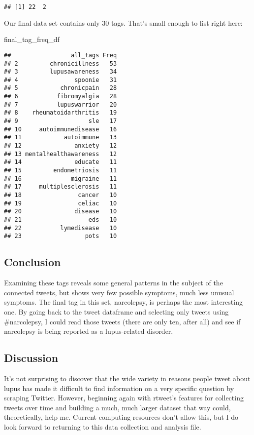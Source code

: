 \documentclass[]{article}
\newenvironment{Shaded}{\begin{snugshade}}{\end{snugshade}}
\newcommand{\NormalTok}[1]{#1}
\begin{document}
\begin{verbatim}
## [1] 22  2
\end{verbatim}

Our final data set contains only 30 tags. That's small enough to list
right here:

\begin{Shaded}
\begin{Highlighting}[]
\NormalTok{final_tag_freq_df}
\end{Highlighting}
\end{Shaded}

\begin{verbatim}
##                 all_tags Freq
## 2         chronicillness   53
## 3         lupusawareness   34
## 4                spoonie   31
## 5            chronicpain   28
## 6           fibromyalgia   28
## 7           lupuswarrior   20
## 8    rheumatoidarthritis   19
## 9                    sle   17
## 10     autoimmunedisease   16
## 11            autoimmune   13
## 12               anxiety   12
## 13 mentalhealthawareness   12
## 14               educate   11
## 15         endometriosis   11
## 16              migraine   11
## 17     multiplesclerosis   11
## 18                cancer   10
## 19                celiac   10
## 20               disease   10
## 21                   eds   10
## 22           lymedisease   10
## 23                  pots   10
\end{verbatim}

\hypertarget{conclusion}{%
\subsection{Conclusion}\label{conclusion}}

Examining these tags reveals some general patterns in the subject of the
connected tweets, but shows very few possible symptoms, much less
unusual symptoms. The final tag in this set, narcolepsy, is perhaps the
most interesting one. By going back to the tweet dataframe and selecting
only tweets using \#narcolepsy, I could read those tweets (there are
only ten, after all) and see if narcolepsy is being reported as a
lupus-related disorder.

\hypertarget{discussion}{%
\subsection{Discussion}\label{discussion}}

It's not surprising to discover that the wide variety in reasons people
tweet about lupus has made it difficult to find information on a very
specific question by scraping Twitter. However, beginning again with
rtweet's features for collecting tweets over time and building a much,
much larger dataset that way could, theoretically, help me. Current
computing resources don't allow this, but I do look forward to returning
to this data collection and analysis file.
\end{document}
